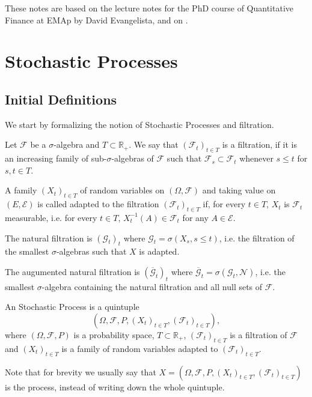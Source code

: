 These notes are based on the lecture notes for the PhD course of
Quantitative Finance at EMAp by David Evangelista, and on \citet{baldi2017introduction}.

\section{Stochastic Processes}

\subsection{Initial Definitions}

We start by formalizing the notion of Stochastic Processes and filtration.

\begin{definition}[Filtration]
	Let $\mathcal F$ be a $\sigma$-algebra and $T \subset \mathbb R_+$. We say
	that $(\mathcal F_t)_{t \in T}$ is a filtration, if it is an increasing family
	of sub-$\sigma$-algebras
	of $\mathcal F$ such that $\mathcal F_s \subset \mathcal F_t$ whenever $s\leq t$ for $s,t \in T$.
\end{definition}

\begin{definition}[Adaptation]
	A family $(X_t)_{t \in T}$ of random variables on $(\Omega, \mathcal F)$ and
	taking value on $(E, \mathcal E)$ is called adapted to the filtration $(\mathcal F_t)_{t\in T}$
	if, for every $t \in T$, $X_t$ is $\mathcal F_t$ measurable, i.e. for every $t \in T$,
	$X_t^{-1}(A) \in \mathcal F_t$ for any $A \in \mathcal E$.
\end{definition}

\begin{definition}
	The natural filtration is $(\mathcal G_t)_t$ where $\mathcal G_t = \sigma(X_s, s\leq t)$, i.e.
	the filtration of the smallest $\sigma$-algebras such that $X$ is adapted.
\end{definition}

\begin{definition}
	The augumented natural filtration is $(\overline{\mathcal G}_t)_t$ where
	$\overline{\mathcal G}_t = \sigma(\mathcal G_t, \mathcal N)$, i.e.
	the smallest $\sigma$-algebra containing the natural filtration
	and all null sets of $\mathcal F$.
\end{definition}

\begin{definition}
	An Stochastic Process is a quintuple
	\begin{displaymath}
		(\Omega, \mathcal F, P, (X_t)_{t \in T}, (\mathcal F_t)_{t\in T}),
	\end{displaymath}
	where $(\Omega, \mathcal F, P)$ is a probability space, $T \subset \mathbb R_+$, $(\mathcal F_t)_{t \in T}$
	is a filtration of $\mathcal F$ and $(X_t)_{t \in T}$ is a family of random variables adapted to $(\mathcal F_t)_{t \in T}$.

	Note that for brevity we usually say that $X =
		(\Omega, \mathcal F, P, (X_t)_{t \in T}, (\mathcal F_t)_{t\in T})$
	is the process, instead of writing down the whole quintuple.
\end{definition}

